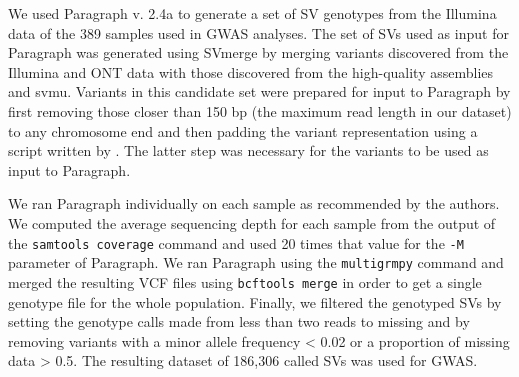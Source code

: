 We used Paragraph v. 2.4a \citep{chen2019}
to generate a set of SV genotypes from the Illumina data of the 389 samples used in
GWAS analyses.  The set of SVs used as input for Paragraph was generated using SVmerge by
merging variants discovered from the Illumina and ONT data with
those discovered from the high-quality assemblies and svmu.
Variants in this candidate set were prepared for input to Paragraph by first removing
those closer than 150 bp (the maximum read length in our dataset) to any
chromosome end and then padding the variant representation using a script written by
\cite{hickey2020}. The latter step was necessary for the variants to be used
as input to Paragraph.

We ran Paragraph individually on each sample as recommended by the authors.
We computed the average sequencing depth for each sample from the output of the
\texttt{samtools coverage} command and used 20 times that value for the
\texttt{-M} parameter of Paragraph.  We ran Paragraph using the
\texttt{multigrmpy} command and merged the resulting VCF files using
\texttt{bcftools merge} in order to get a  single genotype file for the whole
population. Finally, we filtered the genotyped SVs by setting the genotype calls made
from less than two reads to missing and by removing variants with a minor allele
frequency < 0.02 or a proportion of missing data > 0.5. The resulting dataset
of 186,306 called SVs was used for GWAS.

